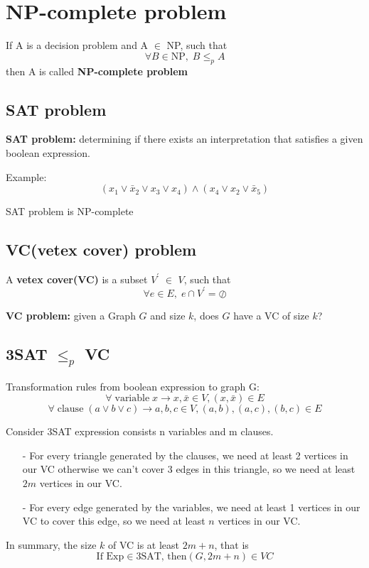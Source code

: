 \documentclass{article}
\begin{document}
\section{NP-complete problem} 
\begin{definition}
If A is a decision problem and A $\in$ NP, such that
\[
\forall B \in \text{NP}, \;  B \leq_{p} A
\]
then A is called \textbf{NP-complete problem}
\end{definition}

\subsection{SAT problem} 

\textbf{SAT problem:} determining if there exists an interpretation that satisfies a given boolean expression.

Example:
\[
(x_{1} \lor \bar x_{2} \lor x_{3} \lor x_{4})\land (x_{4} \lor x_{2} \lor \bar x_{5})
\]
\begin{theorem}
SAT problem is NP-complete
\end{theorem}

\subsection{VC(vetex cover) problem} 
\begin{definition}
A \textbf{vetex cover(VC)} is a subset $V^{'}$ $\in$ $V$, such that
\[
\forall e \in E, \; e \cap V^{'} = \oslash
\]
\end{definition}
\textbf{VC problem:} given a Graph $G$ and size $k$, does $G$ have a VC of size $k$?

\subsection{3SAT  $\leq_{p}$ VC } 

  Transformation rules from boolean expression to graph G:\\
\[
\forall \; \text{variable} \; x \to x, \bar x \in V, (x, \bar x) \in E 
\]
\[
\forall \; \text{clause} \; (a \lor b \lor c) \to a, b, c \in V, (a,b), (a,c), (b,c) \in E
\]

  Consider 3SAT expression consists n variables and m clauses. 
\begin{itemize}
\item[-] For every triangle generated by the clauses, we need at least 2 vertices in our VC otherwise we can't cover 3 edges in this triangle, so we need at least $2m$ vertices in our VC.
\item[-] For every edge generated by the variables, we need at least 1 vertices in our VC to cover this edge, so we need at least $n$ vertices in our VC. 
\end{itemize}
In summary, the size $k$ of VC is at least $2m + n$, that is
\[
\text{If Exp} \in \text{3SAT, then} (G, 2m+n) \in VC 
\]
\end{document}
